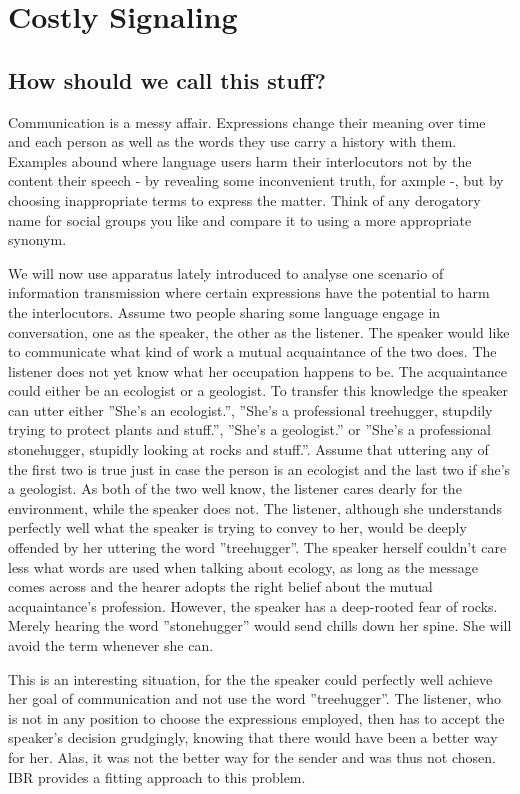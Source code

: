 \documentclass[10]{article}
\begin{document}
\section{Costly Signaling}
\subsection{How should we call this stuff?}
Communication is a messy affair. Expressions change their meaning over time and each person as well as the words they use carry a history with them. Examples abound where language users harm their interlocutors not by the content their speech - by revealing some inconvenient truth, for axmple -, but by choosing inappropriate terms to express the matter. Think of any derogatory name for social groups you like and compare it to using a more appropriate synonym.%

We will now use apparatus lately introduced to analyse one scenario of information transmission where certain expressions have the potential to harm the interlocutors. Assume two people sharing some language engage in conversation, one as the speaker, the other as the listener. The speaker would like to communicate what kind of work a mutual acquaintance of the two does. The listener does not yet know what her occupation happens to be. The acquaintance could either be an ecologist or a geologist. To transfer this knowledge the speaker can utter either ''She's an ecologist.'', ''She's a professional treehugger, stupdily trying to protect plants and stuff.'', ''She's a geologist.'' or ''She's a professional stonehugger, stupidly looking at rocks and stuff.''. Assume that uttering any of the first two is true just in case the person is an ecologist and the last two if she's a geologist. As both of the two well know, the listener cares dearly for the environment, while the speaker does not. The listener, although she understands perfectly well what the speaker is trying to convey to her, would be deeply offended by her uttering the word ''treehugger''. The speaker herself couldn't care less what words are used when talking about ecology, as long as the message comes across and the hearer adopts the right belief about the mutual acquaintance's profession. However, the speaker has a deep-rooted fear of rocks. Merely hearing the word ''stonehugger'' would send chills down her spine. She will avoid the term whenever she can.

This is an interesting situation, for the the speaker could perfectly well achieve her goal of communication and not use the word ''treehugger''. The listener, who is not in any position to choose the expressions employed, then has to accept the speaker's decision grudgingly, knowing that there would have been a better way for her. Alas, it was not the better way for the sender and was thus not chosen. IBR provides a fitting approach to this problem.
\end{document}
